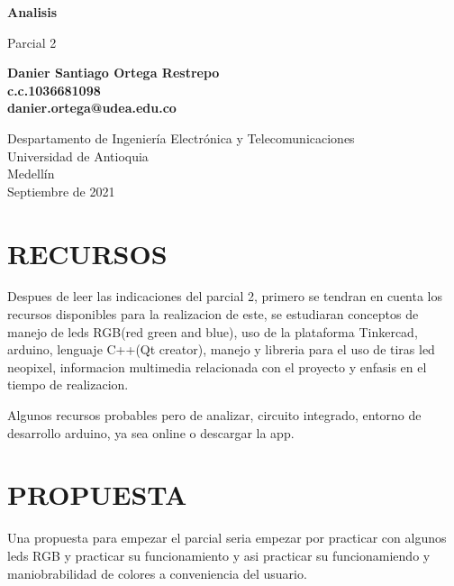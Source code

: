 \documentclass{article}
\begin{document}
\begin{titlepage}
    \begin{center}
        \vspace*{1cm}
            
        \Huge
        \textbf{Analisis}
            
        \vspace{0.5cm}
        \LARGE
        Parcial 2
            
        \vspace{1.5cm}
            
        \textbf{Danier Santiago Ortega Restrepo}\\
        \textbf{c.c.1036681098}\\
        \textbf{danier.ortega@udea.edu.co}
            
        \vfill
            
        \vspace{0.8cm}
            
        \Large
        Despartamento de Ingeniería Electrónica y Telecomunicaciones\\
        Universidad de Antioquia\\
        Medellín\\
       Septiembre de 2021
            
    \end{center}
\end{titlepage}

\newpage
\tableofcontents
\section{RECURSOS}
Despues de leer las indicaciones del parcial 2, primero se tendran en cuenta los recursos disponibles para la realizacion de este, se estudiaran conceptos de manejo de leds RGB(red green and blue), uso de la plataforma Tinkercad, arduino, lenguaje C++(Qt creator), manejo y libreria para el uso de tiras led neopixel, informacion multimedia relacionada con el proyecto y enfasis en el tiempo de realizacion.

Algunos recursos probables pero de analizar, circuito integrado, entorno de desarrollo arduino, ya sea online o descargar la app.

\section{PROPUESTA}
Una propuesta para empezar el parcial seria empezar por practicar con algunos leds RGB y practicar su funcionamiento y asi practicar su funcionamiendo y maniobrabilidad de colores a conveniencia del usuario.
\end{document}
